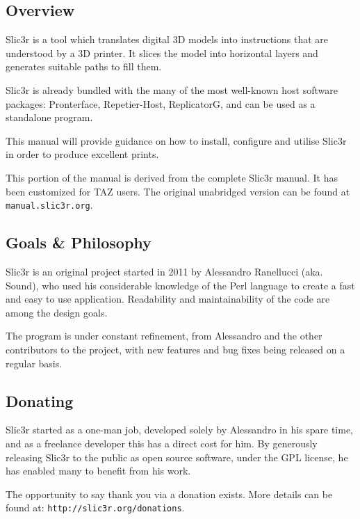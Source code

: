 
\subsection{Overview} %
\label{sec:overview}

Slic3r is a tool which translates digital 3D models into instructions that are understood by a 3D printer.  It slices the model into horizontal layers and generates suitable paths to fill them.

Slic3r is already bundled with the many of the most well-known host software packages: Pronterface, Repetier-Host, ReplicatorG, and can be used as a standalone program.

This manual will provide guidance on how to install, configure and utilise Slic3r in order to produce excellent prints.

This portion of the manual is derived from the complete Slic3r manual. It has been customized for TAZ users. The original unabridged version can be found at \texttt{manual.slic3r.org}.



\subsection{Goals \& Philosophy} %
\label{sec:goals_philosophy}

Slic3r is an original project started in 2011 by Alessandro Ranellucci (aka. Sound), who used his considerable knowledge of the Perl language to create a fast and easy to use application.  Readability and maintainability of the code are among the design goals.

The program is under constant refinement, from Alessandro and the other contributors to the project, with new features and bug fixes being released on a regular basis.



\subsection{Donating} %
\label{sec:donating}

Slic3r started as a one-man job, developed solely by Alessandro in his spare time, and as a freelance developer this has a direct cost for him.  By generously releasing Slic3r to the public as open source software, under the GPL license, he has enabled many to benefit from his work.

The opportunity to say thank you via a donation exists.  More details can be found at: \texttt{http://slic3r.org/donations}.

